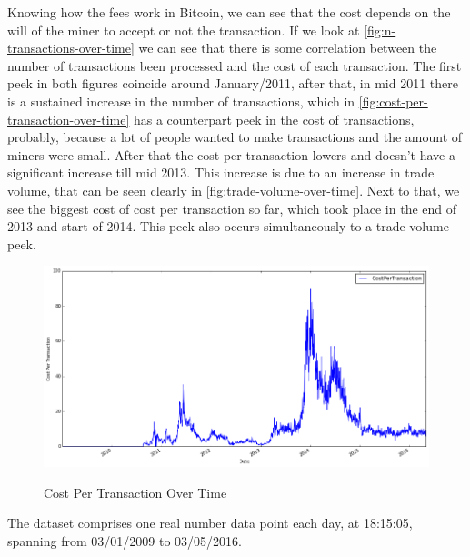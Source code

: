 Knowing how the fees work in Bitcoin, we can see that the cost depends
on the will of the miner to accept or not the transaction. If we look
at \autoref{fig:n-transactions-over-time} we can see that there is
some correlation between the number of transactions been processed and
the cost of each transaction. The first peek in both figures coincide
around January/2011, after that, in mid 2011 there is a sustained
increase in the number of transactions, which in
\autoref{fig:cost-per-transaction-over-time} has a counterpart peek in
the cost of transactions, probably, because a lot of people wanted to
make transactions and the amount of miners were small. After that the
cost per transaction lowers and doesn't have a significant increase
till mid 2013. This increase is due to an increase in trade volume,
that can be seen clearly in \autoref{fig:trade-volume-over-time}. Next
to that, we see the biggest cost of cost per transaction so far, which
took place in the end of 2013 and start of 2014. This peek also occurs
simultaneously to a trade volume peek.

\begin{figure}[bth]
  \myfloatalign
  {\includegraphics[width=1\linewidth]
    {gfx/cost-per-transaction-over-time}}
  \caption{Cost Per Transaction Over Time}
  \label{fig:cost-per-transaction-over-time}
\end{figure}

The dataset comprises one real number data point each day, at
18:15:05, spanning from 03/01/2009 to 03/05/2016.

